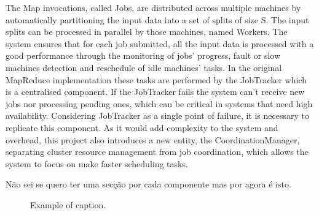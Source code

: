\documentclass[times, 10pt,twocolumn]{article}
\begin{document}
	The Map invocations, called Jobs, are distributed across multiple machines by automatically partitioning the input data into a set of splits of size S. The input splits can be processed in parallel by those machines, named Workers. The system ensures that for each job submitted, all the input data is processed with a good performance through the monitoring of jobs' progress, fault or slow machines detection and reschedule of idle machines' tasks.
	In the original MapReduce implementation these tasks are performed by the JobTracker which is a centralised component. If the JobTracker fails the system can't receive new jobs nor processing pending ones, which can be critical in systems that need high availability.
	Considering JobTracker as a single point of failure, it is necessary to replicate this component. As it would add complexity to the system and overhead, this project also introduces a new entity, the CoordinationManager, separating cluster resource management from job coordination, which allows the system to focus on make faster scheduling tasks.  
	
		
	Não sei se quero ter uma secção por cada componente mas por agora é isto.
	
	
	
	
	
	
	
	
	
	
	\begin{figure}[h]
		\caption{Example of caption.}
	\end{figure}
	
\end{document}
